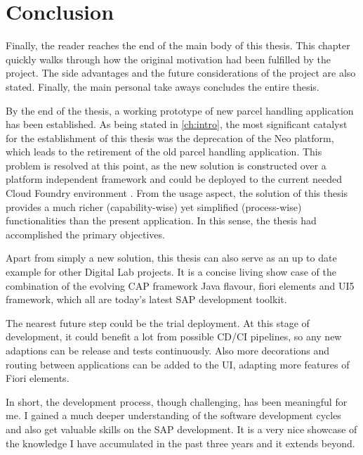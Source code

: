 \chapter*{Conclusion}
\label{ch:sum}


Finally, the reader reaches the end of the main body of this thesis.
This chapter quickly walks through how the original motivation had been fulfilled by the project. The side advantages and the future considerations of the project are also stated. Finally, the main personal take aways concludes the entire thesis.

By the end of the thesis, a working prototype of new parcel handling application has been established.
As being stated in \autoref{ch:intro}, the most significant catalyst for the establishment of this thesis was the deprecation of the Neo platform, which leads to the retirement of the old parcel handling application. This problem is resolved at this point, as the new solution is constructed over a platform independent framework and could be deployed to the current needed Cloud Foundry environment \cite{cf}. From the usage aspect, the solution of this thesis provides a much richer (capability-wise) yet simplified (process-wise) functionalities than the present application. In this sense, the thesis had accomplished the primary objectives.

Apart from simply a new solution, this thesis can also serve as an up to date example for other Digital Lab projects. It is a concise living show case of the combination of the evolving CAP framework Java flavour, fiori elements and UI5 framework, which all are today's latest SAP development toolkit. 

The nearest future step could be the trial deployment. At this stage of development, it could benefit a lot from possible CD/CI pipelines, so any new adaptions can be release and tests continuously. Also more decorations and routing between applications can be added to the UI, adapting more features of Fiori elements.

In short, the development process, though challenging, has been meaningful for me. I gained a much deeper understanding of the software development cycles and also get valuable skills on the SAP development. It is a very nice showcase of the knowledge I have accumulated in the past three years and it extends beyond.
